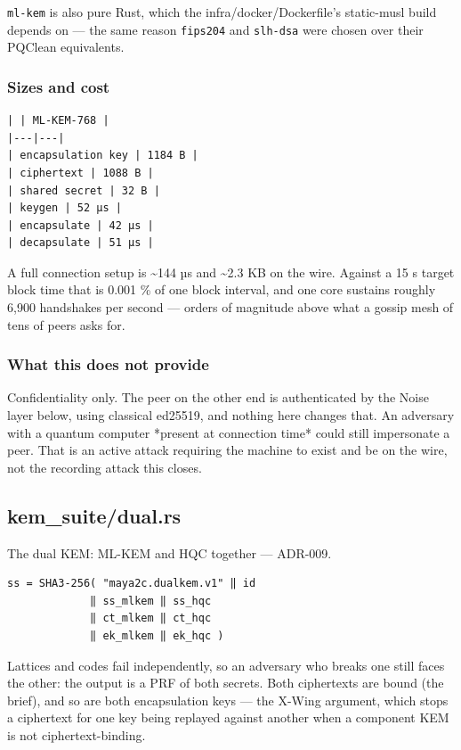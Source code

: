 \documentclass[11pt,a4paper]{article}
\begin{document}
\texttt{ml-kem} is also pure Rust, which the infra/docker/Dockerfile's static-musl build depends
on — the same reason \texttt{fips204} and \texttt{slh-dsa} were chosen over their PQClean
equivalents.

\subsubsection{Sizes and cost}

\begin{verbatim}
| | ML-KEM-768 |
|---|---|
| encapsulation key | 1184 B |
| ciphertext | 1088 B |
| shared secret | 32 B |
| keygen | 52 µs |
| encapsulate | 42 µs |
| decapsulate | 51 µs |
\end{verbatim}

A full connection setup is \textasciitilde{}144 µs and \textasciitilde{}2.3 KB on the wire. Against a 15 s
target block time that is 0.001 \% of one block interval, and one core
sustains roughly 6,900 handshakes per second — orders of magnitude above
what a gossip mesh of tens of peers asks for.

\subsubsection{What this does not provide}

Confidentiality only. The peer on the other end is authenticated by the
Noise layer below, using classical ed25519, and nothing here changes that.
An adversary with a quantum computer *present at connection time* could
still impersonate a peer. That is an active attack requiring the machine to
exist and be on the wire, not the recording attack this closes.

\subsection{kem\_suite/dual.rs}
The dual KEM: ML-KEM and HQC together — ADR-009.

\begin{verbatim}
ss = SHA3-256( "maya2c.dualkem.v1" ‖ id
             ‖ ss_mlkem ‖ ss_hqc
             ‖ ct_mlkem ‖ ct_hqc
             ‖ ek_mlkem ‖ ek_hqc )
\end{verbatim}

Lattices and codes fail independently, so an adversary who breaks one
still faces the other: the output is a PRF of both secrets. Both
ciphertexts are bound (the brief), and so are both encapsulation keys — the
X-Wing argument, which stops a ciphertext for one key being replayed
against another when a component KEM is not ciphertext-binding.
\end{document}

